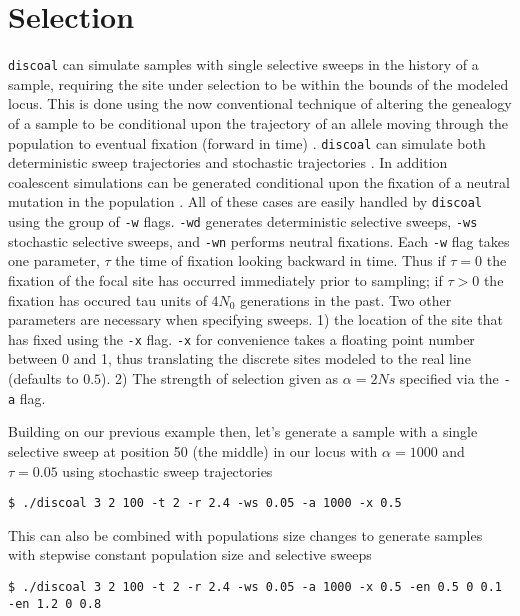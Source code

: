 \documentclass[12pt]{article}
\begin{document}
\section*{Selection}
\texttt{discoal} can simulate samples with single selective sweeps in the history of a sample, requiring the site under selection to be within the bounds of the modeled locus. This is done using the now conventional technique of altering the genealogy of a sample to be conditional upon the trajectory of an allele moving through the population to eventual fixation (forward in time) \cite{Bravermanetal1995,Kim:2002wd}. \texttt{discoal} can simulate both deterministic sweep trajectories \cite{Bravermanetal1995,Kim:2002wd} and stochastic trajectories \cite{Coop:2004pj,Przeworskietal2005}. In addition coalescent simulations can be generated conditional upon the fixation of a neutral mutation in the population \cite{Tajima:1990fx}. All of these cases are easily handled by \texttt{discoal} using the group of \texttt{-w} flags. \texttt{-wd} generates deterministic selective sweeps, \texttt{-ws} stochastic selective sweeps, and \texttt{-wn} performs neutral fixations. Each \texttt{-w} flag takes one parameter, $\tau$ the time of fixation looking backward in time. Thus if $\tau = 0$ the fixation of the focal site has occurred immediately prior to sampling; if $\tau > 0$ the fixation has occured tau units of $4N_0$ generations in the past. Two other parameters are necessary when specifying sweeps. 1) the location of the site that has fixed using the \texttt{-x} flag. \texttt{-x} for convenience takes a floating point number between 0 and 1, thus translating the discrete sites modeled to the real line (defaults to $0.5$). 2) The strength of selection given as $\alpha=2Ns$ specified via the \texttt{-a} flag.

 Building on our previous example then, let's generate a sample with a single selective sweep at position 50 (the middle) in our locus with $\alpha=1000$ and $\tau=0.05$ using stochastic sweep trajectories
\begin{verbatim}
$ ./discoal 3 2 100 -t 2 -r 2.4 -ws 0.05 -a 1000 -x 0.5
\end{verbatim}

This can also be combined with  populations size changes to generate samples with stepwise constant population size and selective sweeps
\begin{verbatim}
$ ./discoal 3 2 100 -t 2 -r 2.4 -ws 0.05 -a 1000 -x 0.5 -en 0.5 0 0.1 -en 1.2 0 0.8
\end{verbatim}
\end{document}
